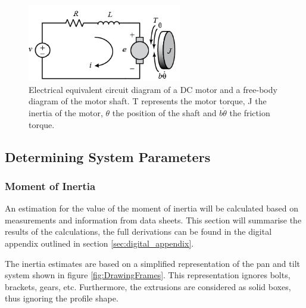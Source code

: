 \documentclass[../../main.tex]{subfiles}
\begin{document}
\begin{figure}[H]
    \centering
    \includegraphics[width=0.6\textwidth]{Sections/System_Modelling/Images/Armature_Layout.PNG}
    \caption{Electrical equivalent circuit diagram of a DC motor and a free-body diagram of the motor shaft. T represents the motor torque, J the inertia of the motor, $\theta$ the position of the shaft and $b\dot{\theta}$ the friction torque. \cite{universityofmichigan2019}}
    \label{fig:Armature_Circuit}
\end{figure}







\subsection{Determining System Parameters}\label{subsec:motorParameters}
\subsubsection*{Moment of Inertia}
An estimation for the value of the moment of inertia will be calculated based on measurements and information from data sheets. This section will summarise the results of the calculations, the full derivations can be found in the digital appendix outlined in section \ref{sec:digital_appendix}.

The inertia estimates are based on a simplified representation of the pan and tilt system shown in figure \ref{fig:DrawingFrames}. This representation ignores bolts, brackets, gears, etc. Furthermore, the extrusions are considered as solid boxes, thus ignoring the profile shape.
\end{document}
